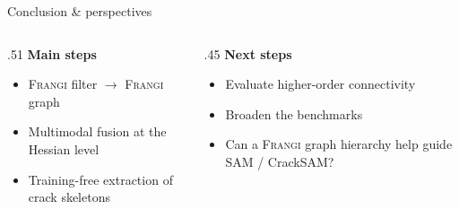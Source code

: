 \documentclass[10pt,aspectratio=169]{beamer}
\newcommand{\Frangi}{{\rmfamily\mdseries\textsc{Frangi}}}
\begin{document}
\begin{frame}[t]{Conclusion \& perspectives}
\vspace{2mm}
\begin{columns}[T,onlytextwidth]
\begin{column}{.51\textwidth}
\textcolor{inria-2024-bleu-canard}{\textbf{Main steps}}
\begin{itemize}\setlength\itemsep{4mm}
 \item \Frangi{} filter $\rightarrow$ \Frangi{} graph 
 \item Multimodal fusion at the Hessian level
 \item Training-free extraction of crack skeletons
\end{itemize}
\end{column}
\begin{column}{.45\textwidth}
\textcolor{inria-rouge}{\textbf{Next steps}}
\begin{itemize}\setlength\itemsep{4mm}
 \item Evaluate higher-order connectivity
 \item Broaden the benchmarks
 \item Can a \Frangi{} graph hierarchy help guide SAM / CrackSAM?\par{}\ 
\end{itemize}
\end{column}
\end{columns}
\vspace{4mm}


\end{frame}
\end{document}
